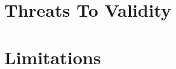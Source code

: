 \documentclass[sigconf, nonacm]{acmart}
\begin{document}
\section{Threats To Validity}

\section{Limitations}







\end{document}
